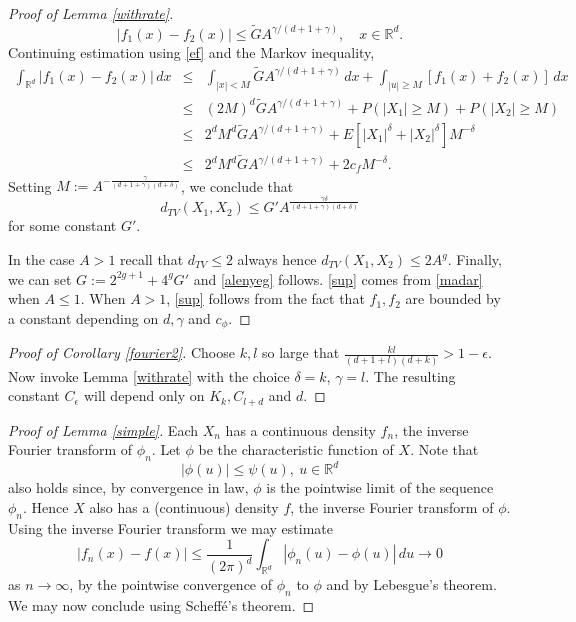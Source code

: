 \documentclass{article}
\begin{document}
\begin{proof}[Proof of Lemma \ref{withrate}]
\begin{equation}
|f_{1}(x)-f_{2}(x)| \leq \tilde{G}A^{\gamma/(d+1+\gamma)},\quad x\in\mathbb{R}^{d}.
\end{equation}
Continuing estimation using \eqref{ef} and the Markov inequality,
\begin{eqnarray*}
\int_{\mathbb{R}^{d}}|f_{1}(x)-f_{2}(x)|\, dx &\leq& \int_{|x|<M} \tilde{G} A^{\gamma/(d+1+\gamma)}\,dx +
\int_{|u|\geq M}[f_{1}(x)+f_{2}(x)]\, dx\\
&\leq& (2M)^{d}\tilde{G}A^{\gamma/(d+1+\gamma)}+P(|X_{1}|\geq M)+P(|X_{2}|\geq M)\\
&\leq& 
2^{d}M^{d}\tilde{G}A^{\gamma/(d+1+\gamma)}+E[|X_{1}|^{\delta}+|X_{2}|^{\delta}]M^{-\delta}\\
&\leq& 2^{d}M^{d}\tilde{G}A^{\gamma/(d+1+\gamma)}+ 2c_{f}M^{-\delta}.
\end{eqnarray*}
Setting $M:=A^{-\frac{\gamma}{(d+1+\gamma)(d+\delta)}}$, we conclude that
$$
d_{TV}(X_{1},X_{2})\leq G'A^{\frac{\gamma\delta}{(d+1+\gamma)(d+\delta)}} 
$$
for some constant $G'$.

In the case $A>1$ recall that $d_{TV}\leq 2$ always hence $d_{TV}(X_{1},X_{2})\leq 2A^{g}$. 
Finally, we can set $G:=2^{2g+1}+4^{g}G'$ and \eqref{alenyeg} follows. \eqref{sup} comes from
\eqref{madar} when $A\leq 1$. When $A>1$, \eqref{sup} follows from the fact that $f_{1},f_{2}$ are bounded by a constant 
depending on $d,\gamma$ and $c_{\phi}$. 	
\end{proof}

\begin{proof}[Proof of Corollary \ref{fourier2}] Choose $k,l$ so large that $\frac{kl}{(d+1+l)(d+k)}>1-\epsilon$. Now invoke Lemma 
\ref{withrate} with the choice $\delta=k$, $\gamma=l$. 
The resulting constant $C_{\epsilon}$ will depend only on $K_{k},C_{l+d}$ and $d$.
\end{proof}

\begin{proof}[Proof of Lemma \ref{simple}]
Each $X_{n}$ has a continuous density $f_{n}$, the inverse Fourier transform of $\phi_{n}$.
Let $\phi$ be the characteristic function of $X$. Note that 
\begin{equation}\label{mathias}
|\phi(u)|\leq \psi(u),\ u\in\mathbb{R}^{d}	
\end{equation}
also holds since, by convergence in law, $\phi$ is the pointwise limit of the sequence $\phi_{n}$.
Hence $X$ also has a (continuous) density $f$, the inverse Fourier transform of $\phi$.
{}
Using the inverse Fourier transform we may estimate
$$
|f_{n}(x)-f(x)|\leq \frac{1}{(2\pi)^{d}}\int_{\mathbb{R}^{d}}|\phi_{n}(u)-\phi(u)|\, du\to 0
$$
as $n\to\infty$,
by the pointwise convergence of $\phi_{n}$ to $\phi$ and by Lebesgue's theorem. 
We may now conclude using Scheff\'e's theorem.
\end{proof}
\end{document}
